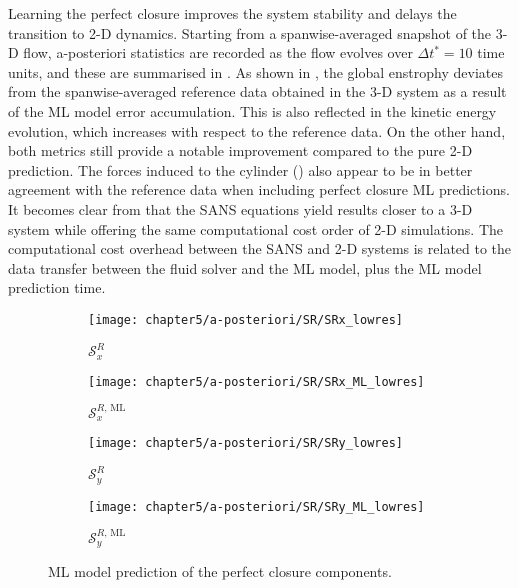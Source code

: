 \documentclass[../main.tex]{subfiles}
\begin{document}
Learning the perfect closure improves the system stability and delays the transition to 2-D dynamics.
Starting from a spanwise-averaged snapshot of the 3-D flow, a-posteriori statistics are recorded as the flow evolves over $\Delta t^*=10$ time units, and these are summarised in .
As shown in , the global enstrophy deviates from the spanwise-averaged reference data obtained in the 3-D system as a result of the ML model error accumulation.
This is also reflected in the kinetic energy evolution, which increases with respect to the reference data.
On the other hand, both metrics still provide a notable improvement compared to the pure 2-D prediction.
The forces induced to the cylinder () also appear to be in better agreement with the reference data when including perfect closure ML predictions.
It becomes clear from  that the SANS equations yield results closer to a 3-D system while offering the same computational cost order of 2-D simulations.
The computational cost overhead between the SANS and 2-D systems is related to the data transfer between the fluid solver and the ML model, plus the ML model prediction time.

\begin{figure}[t]
\centering
\begin{subfigure}[t]{0.6\linewidth}
    \texttt{[image: chapter5/a-posteriori/SR/SRx\_lowres]}
    \caption{$\mathcal{S}^R_x$} 
\end{subfigure}
\begin{subfigure}[t]{0.6\linewidth}
    \texttt{[image: chapter5/a-posteriori/SR/SRx\_ML\_lowres]}
    \caption{$\mathcal{S}^{R,\,\mathrm{ML}}_x$} 
\end{subfigure}
\begin{subfigure}[t]{0.6\linewidth}
    \texttt{[image: chapter5/a-posteriori/SR/SRy\_lowres]}
    \caption{$\mathcal{S}^R_y$} 
\end{subfigure}
\begin{subfigure}[t]{0.6\linewidth}
    \texttt{[image: chapter5/a-posteriori/SR/SRy\_ML\_lowres]}
    \caption{$\mathcal{S}^{R,\,\mathrm{ML}}_y$} 
\end{subfigure}
\caption{ML model prediction of the perfect closure components.}
\label{fig:ML_SR_a-priori}
\end{figure}
\end{document}
